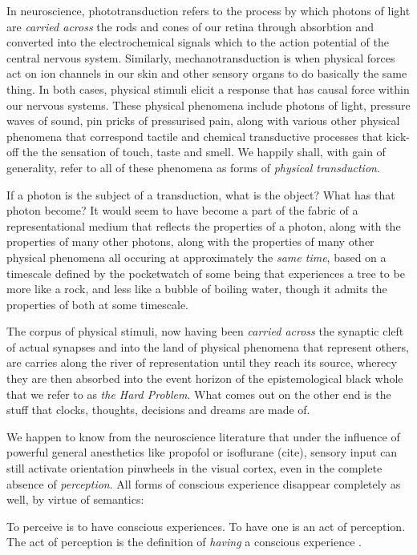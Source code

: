 \documentclass[runningheads]{llncs}
\begin{document}
In neuroscience, phototransduction refers to the process by which photons of light are \emph{carried across} the rods and cones of our retina through absorbtion and converted into the electrochemical signals which to the action potential of the central nervous system. Similarly, mechanotransduction is when physical forces act on ion channels in our skin and other sensory organs to do basically the same thing. In both cases, physical stimuli elicit a response that has causal force within our nervous systems. These physical phenomena include photons of light, pressure waves of sound, pin pricks of pressurised pain, along with various other physical phenomena that correspond tactile and chemical transductive processes that kick-off the the sensation of touch, taste and smell. We happily shall, with gain of generality, refer to all of these phenomena as forms of \emph{physical transduction}.

If a photon is the subject of a transduction, what is the object? What has that photon become? It would seem to have become a part of the fabric of a representational medium that reflects the properties of a photon, along with the properties of many other photons, along with the properties of many other physical phenomena all occuring at approximately the \emph{same time}, based on a timescale defined by the pocketwatch of some being that experiences a tree to be more like a rock, and less like a bubble of boiling water, though it admits the properties of both at some timescale.

The corpus of physical stimuli, now having been \emph{carried across} the synaptic cleft of actual synapses and into the land of physical phenomena that represent others, are carries along the river of representation until they reach its source, wherecy they are then absorbed into the event horizon of the epistemological black whole that we refer to as \emph{the Hard Problem}. What comes out on the other end is the stuff that clocks, thoughts, decisions and dreams are made of.

We happen to know from the neuroscience literature that under the influence of powerful general anesthetics like propofol or isoflurane (cite), sensory input can still activate orientation pinwheels in the visual cortex, even in the complete absence of \emph{perception}. All forms of conscious experience disappear completely as well, by virtue of semantics:

\setcounter{definition}{0}
\begin{assertion}
	To perceive is to have conscious experiences. To have one is an act of perception. The act of perception is the definition of \emph{having} a conscious experience \cite{Formalism}.
\end{assertion}
\end{document}
